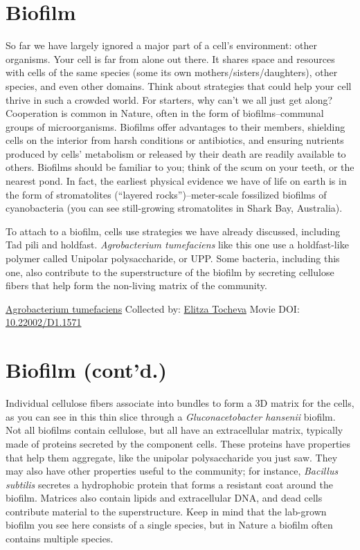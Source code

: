 \documentclass[]{tufte-book}
\begin{document}
\hypertarget{biofilm}{%
\section{Biofilm}\label{biofilm}}

So far we have largely ignored a major part of a cell's environment: other organisms. Your cell is far from alone out there. It shares space and resources with cells of the same species (some its own mothers/sisters/daughters), other species, and even other domains. Think about strategies that could help your cell thrive in such a crowded world. For starters, why can't we all just get along? Cooperation is common in Nature, often in the form of biofilms--communal groups of microorganisms. Biofilms offer advantages to their members, shielding cells on the interior from harsh conditions or antibiotics, and ensuring nutrients produced by cells' metabolism or released by their death are readily available to others. Biofilms should be familiar to you; think of the scum on your teeth, or the nearest pond. In fact, the earliest physical evidence we have of life on earth is in the form of stromatolites (``layered rocks'')--meter-scale fossilized biofilms of cyanobacteria (you can see still-growing stromatolites in Shark Bay, Australia).

To attach to a biofilm, cells use strategies we have already discussed, including Tad pili and holdfast. \emph{Agrobacterium tumefaciens} like this one use a holdfast-like polymer called Unipolar polysaccharide, or UPP. Some bacteria, including this one, also contribute to the superstructure of the biofilm by secreting cellulose fibers that help form the non-living matrix of the community.



\hypertarget{htmlwidget-c80596f39e26a4b82ca7}{}

\label{fig:9-1}\protect\hyperlink{tree}{Agrobacterium tumefaciens} Collected by: \protect\hyperlink{elitza_tocheva}{Elitza Tocheva} Movie DOI: \href{https://doi.org/10.22002/D1.1571}{10.22002/D1.1571}

\hypertarget{biofilm-contd.}{%
\section{Biofilm (cont'd.)}\label{biofilm-contd.}}

Individual cellulose fibers associate into bundles to form a 3D matrix for the cells, as you can see in this thin slice through a \emph{Gluconacetobacter hansenii} biofilm. Not all biofilms contain cellulose, but all have an extracellular matrix, typically made of proteins secreted by the component cells. These proteins have properties that help them aggregate, like the unipolar polysaccharide you just saw. They may also have other properties useful to the community; for instance, \emph{Bacillus subtilis} secretes a hydrophobic protein that forms a resistant coat around the biofilm. Matrices also contain lipids and extracellular DNA, and dead cells contribute material to the superstructure. Keep in mind that the lab-grown biofilm you see here consists of a single species, but in Nature a biofilm often contains multiple species.
\end{document}
